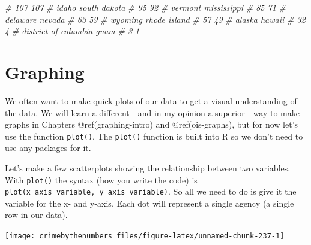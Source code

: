 \documentclass[
  a4paper,
]{krantz}
\makeatletter
\newenvironment{Shaded}{\begin{snugshade}}{\end{snugshade}}
\newcommand{\CommentTok}[1]{\textcolor[rgb]{0.56,0.35,0.01}{\textit{#1}}}
\newcommand{\FunctionTok}[1]{\textcolor[rgb]{0.00,0.00,0.00}{#1}}
\newcommand{\NormalTok}[1]{#1}
\newcommand{\SpecialCharTok}[1]{\textcolor[rgb]{0.00,0.00,0.00}{#1}}
\newenvironment{kframe}{%
\medskip{}
\setlength{\fboxsep}{.8em}
 \def\at@end@of@kframe{}%
 \ifinner\ifhmode%
  \def\at@end@of@kframe{\end{minipage}}%
  \begin{minipage}{\columnwidth}%
 \fi\fi%
 \def\FrameCommand##1{\hskip\@totalleftmargin \hskip-\fboxsep
 \colorbox{shadecolor}{##1}\hskip-\fboxsep
     \hskip-\linewidth \hskip-\@totalleftmargin \hskip\columnwidth}%
 \MakeFramed {\advance\hsize-\width
   \@totalleftmargin\z@ \linewidth\hsize
   \@setminipage}}%
 {\par\unskip\endMakeFramed%
 \at@end@of@kframe}
\renewenvironment{Shaded}{\begin{kframe}}{\end{kframe}}
\makeatother
\begin{document}
\begin{Shaded}
\begin{Highlighting}[]
\CommentTok{\#                  107                  107 }
\CommentTok{\#                idaho         south dakota }
\CommentTok{\#                   95                   92 }
\CommentTok{\#              vermont          mississippi }
\CommentTok{\#                   85                   71 }
\CommentTok{\#             delaware               nevada }
\CommentTok{\#                   63                   59 }
\CommentTok{\#              wyoming         rhode island }
\CommentTok{\#                   57                   49 }
\CommentTok{\#               alaska               hawaii }
\CommentTok{\#                   32                    4 }
\CommentTok{\# district of columbia                 guam }
\CommentTok{\#                    3                    1}
\end{Highlighting}
\end{Shaded}

\hypertarget{graphing-1}{%
\section{Graphing}\label{graphing-1}}

We often want to make quick plots of our data to get a
visual understanding of the data. We will learn a different
- and in my opinion a superior - way to make graphs in
Chapters @ref(graphing-intro) and @ref(ois-graphs), but for
now let's use the function \texttt{plot()}. The
\texttt{plot()} function is built into R so we don't need to
use any packages for it.

Let's make a few scatterplots showing the relationship
between two variables. With \texttt{plot()} the syntax (how
you write the code) is
\texttt{plot(x\_axis\_variable,\ y\_axis\_variable)}. So all
we need to do is give it the variable for the x- and y-axis.
Each dot will represent a single agency (a single row in our
data).

\begin{Shaded}
\end{Shaded}

\begin{center}\texttt{[image: crimebythenumbers\_files/figure-latex/unnamed-chunk-237-1]} \end{center}
\end{document}
